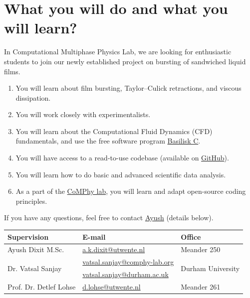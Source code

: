 \documentclass[a4paper,10pt]{article}
\begin{document}
\section*{What you will do and what you will learn?}
In Computational Multiphase Physics Lab, we are looking for enthusiastic students to join our newly established project on bursting of sandwiched liquid films.

\begin{enumerate}
\item You will learn about film bursting, Taylor--Culick retractions, and viscous dissipation. 
\item You will work closely with experimentalists. 
\item You will learn about the Computational Fluid Dynamics (CFD) fundamentals, and use the free software program \href{http://basilisk.fr}{Basilisk C}.
\item You will have access to a read-to-use codebase (available on \href{https://github.com/comphy-lab/bubbleinSheet}{GitHub}).
\item You will learn how to do basic and advanced scientific data analysis.
\item As a part of the \href{https://comphy-lab.org}{CoMPhy lab}, you will learn and adapt open-source coding principles. 
\end{enumerate}

If you have any questions, feel free to contact \href{mailto:a.k.dixit@utwente.nl}{Ayush} (details below).
\begin{center}
\begin{tabular}{|l|l|l|}
\hline \textbf{Supervision} & \textbf{E-mail} & \textbf{Office} \\
\hline Ayush Dixit M.Sc. & \href{mailto:a.k.dixit@utwente.nl}{a.k.dixit@utwente.nl} & Meander 250 \\
\hline \multirow{2}{*}{Dr. Vatsal Sanjay} & \href{mailto:vatsal.sanjay@comphy-lab.org}{vatsal.sanjay@comphy-lab.org} & \multirow{2}{*}{Durham University} \\
& \href{mailto:vatsal.sanjay@durham.ac.uk}{vatsal.sanjay@durham.ac.uk} & \\
\hline Prof. Dr. Detlef Lohse & \href{mailto:d.lohse@utwente.nl}{d.lohse@utwente.nl} & Meander 261  \\
\hline
\end{tabular}
\end{center}

\printbibliography
\end{document}
